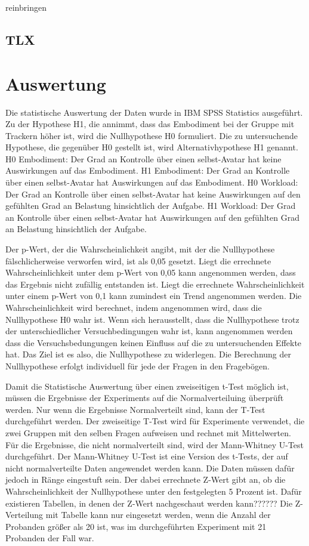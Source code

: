 reinbringen


\subsection{TLX}


\section{Auswertung}
Die statistische Auswertung der Daten wurde in IBM SPSS Statistics ausgeführt. 
Zu der Hypothese H1, die annimmt, dass das Embodiment bei der Gruppe mit Trackern höher ist, wird die Nullhypothese H0 formuliert. Die zu untersuchende Hypothese, die gegenüber H0 gestellt ist, wird Alternativhypothese H1 genannt.
H0 Embodiment: Der Grad an Kontrolle über einen selbst-Avatar hat keine Auswirkungen auf das Embodiment.
H1 Embodiment: Der Grad an Kontrolle über einen selbst-Avatar hat Auswirkungen auf das Embodiment.
H0 Workload: Der Grad an Kontrolle über einen selbst-Avatar hat keine Auswirkungen auf den gefühlten Grad an Belastung hinsichtlich der Aufgabe.
H1 Workload: Der Grad an Kontrolle über einen selbst-Avatar hat Auswirkungen auf den gefühlten Grad an Belastung hinsichtlich der Aufgabe.

Der p-Wert, der die Wahrscheinlichkeit angibt, mit der die Nullhypothese fälschlicherweise verworfen wird, ist als 0,05 gesetzt.
Liegt die errechnete Wahrscheinlichkeit unter dem p-Wert von 0,05 kann angenommen werden, dass das Ergebnis nicht zufällig entstanden ist. Liegt die errechnete Wahrscheinlichkeit unter einem p-Wert von 0,1 kann zumindest ein Trend angenommen werden.
Die Wahrscheinlichkeit wird berechnet, indem angenommen wird, dass die Nullhypothese H0 wahr ist. Wenn sich herausstellt, dass die Nullhypothese trotz der unterschiedlicher Versuchbedingungen wahr ist, kann angenommen werden dass die Versuchsbedungungen keinen Einfluss auf die zu untersuchenden Effekte hat. Das Ziel ist es also, die Nullhypothese zu widerlegen.
Die Berechnung der Nullhypothese erfolgt individuell für jede der Fragen in den Fragebögen.

Damit die Statistische Auswertung über einen zweiseitigen t-Test möglich ist, müssen die Ergebnisse der Experiments auf die Normalverteiluing überprüft werden. Nur wenn die Ergebnisse Normalverteilt sind, kann der T-Test durchgeführt werden. Der zweiseitige T-Test wird für Experimente verwendet, die zwei Gruppen mit den selben Fragen aufweisen und rechnet mit Mittelwerten. Für die Ergebnisse, die nicht normalverteilt sind, wird der Mann-Whitney U-Test durchgeführt. Der Mann-Whitney U-Test ist eine Version des t-Tests, der auf nicht normalverteilte Daten angewendet werden kann. Die Daten müssen dafür jedoch in Ränge eingestuft sein. Der dabei errechnete Z-Wert gibt an, ob die Wahrscheinlichkeit der Nullhypothese unter den festgelegten 5 Prozent ist. Dafür existieren Tabellen, in denen der Z-Wert nachgeschaut werden kann?????? Die Z-Verteilung mit Tabelle kann nur eingesetzt werden, wenn die Anzahl der Probanden größer als 20 ist, was im durchgeführten Experiment mit 21 Probanden der Fall war.



